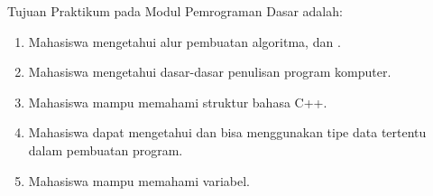 \documentclass[../main.tex]{subfiles}
\begin{document}
    \noindent Tujuan Praktikum pada Modul {\thechapter} Pemrograman Dasar adalah:
    \begin{enumerate}
        \item Mahasiswa mengetahui alur pembuatan algoritma, {\pseudocode} dan {\flowchart}.
        \item Mahasiswa mengetahui dasar-dasar penulisan program komputer.
        \item Mahasiswa mampu memahami struktur bahasa C++.
        \item Mahasiswa dapat mengetahui dan bisa menggunakan tipe data tertentu dalam pembuatan program.
        \item Mahasiswa mampu memahami {\typecasting} variabel.
    \end{enumerate}
\end{document}
